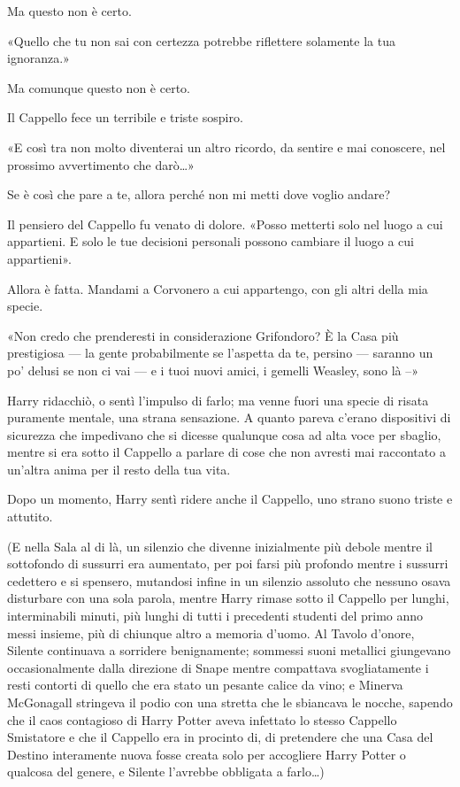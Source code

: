 Ma questo non è certo.

«Quello che tu non sai con certezza potrebbe riflettere solamente la tua ignoranza.»

Ma comunque questo non è certo.

Il Cappello fece un terribile e triste sospiro.

«E così tra non molto diventerai un altro ricordo, da sentire e mai conoscere, nel prossimo avvertimento che darò…»

Se è così che pare a te, allora perché non mi metti dove voglio andare?

Il pensiero del Cappello fu venato di dolore. «Posso metterti solo nel luogo a cui appartieni. E solo le tue decisioni personali possono cambiare il luogo a cui appartieni».

Allora è fatta. Mandami a Corvonero a cui appartengo, con gli altri della mia specie.

«Non credo che prenderesti in considerazione Grifondoro? È la Casa più prestigiosa — la gente probabilmente se l’aspetta da te, persino — saranno un po’ delusi se non ci vai — e i tuoi nuovi amici, i gemelli Weasley, sono là –»

Harry ridacchiò, o sentì l’impulso di farlo; ma venne fuori una specie di risata puramente mentale, una strana sensazione. A quanto pareva c’erano dispositivi di sicurezza che impedivano che si dicesse qualunque cosa ad alta voce per sbaglio, mentre si era sotto il Cappello a parlare di cose che non avresti mai raccontato a un’altra anima per il resto della tua vita.

Dopo un momento, Harry sentì ridere anche il Cappello, uno strano suono triste e attutito.

(E nella Sala al di là, un silenzio che divenne inizialmente più debole mentre il sottofondo di sussurri era aumentato, per poi farsi più profondo mentre i sussurri cedettero e si spensero, mutandosi infine in un silenzio assoluto che nessuno osava disturbare con una sola parola, mentre Harry rimase sotto il Cappello per lunghi, interminabili minuti, più lunghi di tutti i precedenti studenti del primo anno messi insieme, più di chiunque altro a memoria d’uomo. Al Tavolo d’onore, Silente continuava a sorridere benignamente; sommessi suoni metallici giungevano occasionalmente dalla direzione di Snape mentre compattava svogliatamente i resti contorti di quello che era stato un pesante calice da vino; e Minerva McGonagall stringeva il podio con una stretta che le sbiancava le nocche, sapendo che il caos contagioso di Harry Potter aveva infettato lo stesso Cappello Smistatore e che il Cappello era in procinto di, di pretendere che una Casa del Destino interamente nuova fosse creata solo per accogliere Harry Potter o qualcosa del genere, e Silente l’avrebbe obbligata a farlo…)

